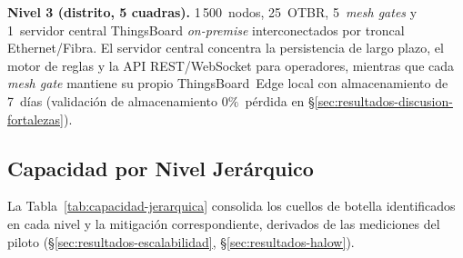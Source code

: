 \textbf{Nivel 3 (distrito, 5 cuadras).} 1\,500~nodos, 25~OTBR, 5~\emph{mesh gates} y 1~servidor central ThingsBoard \emph{on-premise} interconectados por troncal Ethernet/Fibra. El servidor central concentra la persistencia de largo plazo, el motor de reglas y la API REST/WebSocket para operadores, mientras que cada \emph{mesh gate} mantiene su propio ThingsBoard~Edge local con almacenamiento de 7~días (validación de almacenamiento $0\%$~pérdida en §\ref{sec:resultados-discusion-fortalezas}).

\subsection{Capacidad por Nivel Jerárquico}
\label{sec:viabilidad-capacidad}

La Tabla~\ref{tab:capacidad-jerarquica} consolida los cuellos de botella identificados en cada nivel y la mitigación correspondiente, derivados de las mediciones del piloto (§\ref{sec:resultados-escalabilidad}, §\ref{sec:resultados-halow}).

\begin{table}[H]
\centering
\caption{Capacidad y cuellos de botella esperados por nivel jerárquico}
\label{tab:capacidad-jerarquica}
\end{table}

